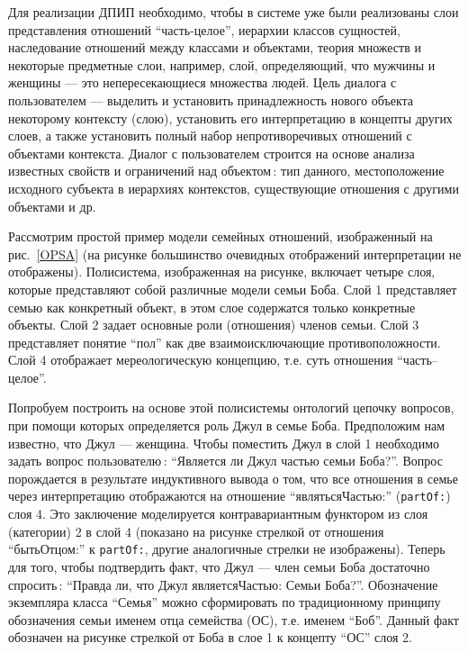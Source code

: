 \documentclass[utf8]{../IncArticle}
\newcommand{\e}[2][fcolor]{\textcolor{pcolor}{[}\textcolor{#1}{#2}\textcolor{pcolor}{]}}
\begin{document}
Для реализации ДПИП необходимо, чтобы в системе уже были реализованы
слои представления отношений ``часть-целое'', иерархии классов
сущностей, наследование отношений между классами и объектами, теория
множеств и некоторые предметные слои, например, слой, определяющий,
что мужчины и женщины --- это непересекающиеся множества людей.  Цель
диалога с пользователем --- выделить и установить принадлежность нового
объекта некоторому контексту (слою), установить его интерпретацию в
концепты других слоев, а также установить полный набор
непротиворечивых отношений с объектами контекста.  Диалог с
пользователем строится на основе анализа известных свойств и
ограничений над объектом\,: тип данного, местоположение исходного
субъекта в иерархиях контекстов, существующие отношения с другими
объектами и др.


Рассмотрим простой пример модели семейных отношений, изображенный на
рис.~\ref{OPSA} (на рисунке большинство очевидных отображений
интерпретации не отображены).  Полисистема, изображенная на рисунке,
включает четыре слоя, которые представляют собой различные модели
семьи Боба.  Слой 1 представляет семью как конкретный объект, в этом
слое содержатся только конкретные объекты.  Слой 2 задает основные
роли (отношения) членов семьи. Слой 3 представляет понятие ``пол'' как
две взаимоисключающие противоположности.  Слой 4 отображает
мереологическую концепцию, т.е. суть отношения ``часть--целое''.

Попробуем построить на основе этой полисистемы онтологий цепочку
вопросов, при помощи которых определяется роль Джул в семье Боба.
Предположим нам известно, что Джул --- женщина.  Чтобы поместить Джул
в слой 1 необходимо задать вопрос пользователю\,: ``Является ли Джул
частью семьи Боба?''.  Вопрос порождается в результате индуктивного
вывода о том, что все отношения в семье через интерпретацию
отображаются на отношение ``являтьсяЧастью:'' (\texttt{partOf:}) слоя 4.  Это заключение
моделируется контравариантным функтором из слоя (категории) 2 в слой 4
(показано на рисунке стрелкой от отношения ``бытьОтцом:'' к
\texttt{partOf:}, другие аналогичные стрелки не изображены).  Теперь для
того, чтобы подтвердить факт, что Джул --- член семьи Боба достаточно
спросить\,: ``Правда ли, что Джул являетсяЧастью: Семьи Боба?''.
Обозначение экземпляра класса ``Семья'' можно сформировать по традиционному
принципу обозначения семьи именем отца семейства (ОС), т.е. именем
``Боб''.  Данный факт обозначен на рисунке стрелкой от Боба в слое 1 к
концепту ``ОС'' слоя 2.
\end{document}

